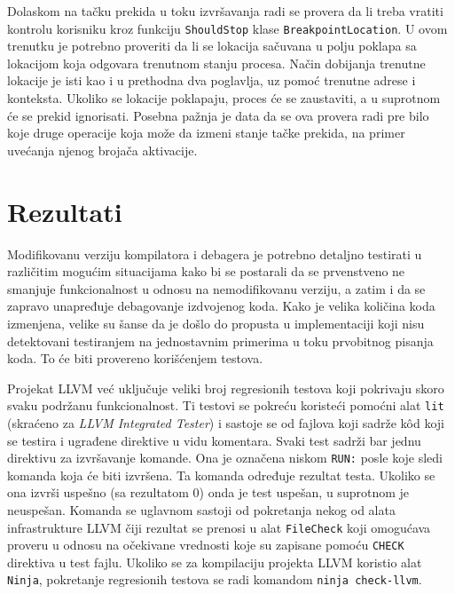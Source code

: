 \documentclass[12pt,oneside]{memoir}
\begin{document}
Dolaskom na tačku prekida u toku izvršavanja radi se provera da li treba vratiti kontrolu korisniku kroz funkciju \verb|ShouldStop| klase \verb|BreakpointLocation|.
U ovom trenutku je potrebno proveriti da li se lokacija sačuvana u polju poklapa sa lokacijom koja odgovara trenutnom stanju procesa.
Način dobijanja trenutne lokacije je isti kao i u prethodna dva poglavlja, uz pomoć trenutne adrese i konteksta.
Ukoliko se lokacije poklapaju, proces će se zaustaviti, a u suprotnom će se prekid ignorisati.
Posebna pažnja je data da se ova provera radi pre bilo koje druge operacije koja može da izmeni stanje tačke prekida, na primer uvećanja njenog brojača aktivacije.

\chapter{Rezultati}
\label{sec:results}

Modifikovanu verziju kompilatora i debagera je potrebno detaljno testirati u različitim mogućim situacijama kako bi se postarali da se prvenstveno ne smanjuje funkcionalnost u odnosu na nemodifikovanu verziju, a zatim i da se zapravo unapređuje debagovanje izdvojenog koda.
Kako je velika količina koda izmenjena, velike su šanse da je došlo do propusta u implementaciji koji nisu detektovani testiranjem na jednostavnim primerima u toku prvobitnog pisanja koda.
To će biti provereno korišćenjem testova.

Projekat LLVM već uključuje veliki broj regresionih testova koji pokrivaju skoro svaku podržanu funkcionalnost.
Ti testovi se pokreću koristeći pomoćni alat \verb|lit| (skraćeno za {\em LLVM Integrated Tester}) i sastoje se od fajlova koji sadrže k\^od koji se testira i ugrađene direktive u vidu komentara.
Svaki test sadrži bar jednu direktivu za izvršavanje komande. Ona je označena niskom \verb|RUN:| posle koje sledi komanda koja će biti izvršena.
Ta komanda određuje rezultat testa. Ukoliko se ona izvrši uspešno (sa rezultatom 0) onda je test uspešan, u suprotnom je neuspešan.
Komanda se uglavnom sastoji od pokretanja nekog od alata infrastrukture LLVM čiji rezultat se prenosi u alat \verb|FileCheck| koji omogućava proveru u odnosu na očekivane vrednosti koje su zapisane pomoću \verb|CHECK| direktiva u test fajlu. 
Ukoliko se za kompilaciju projekta LLVM koristio alat \verb|Ninja|, pokretanje regresionih testova se radi komandom \verb|ninja check-llvm|.
\end{document}
